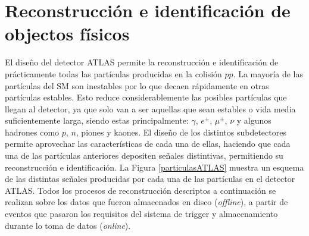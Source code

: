 \chapter{Reconstrucción e identificación de objectos físicos} %



El diseño del detector ATLAS permite la reconstrucción e identificación de prácticamente todas las
partículas producidas en la colisión $pp$. 
La mayoría de las partículas del SM son inestables por lo que decaen rápidamente en otras partículas estables. Esto reduce considerablemente las posibles partículas que llegan
al detector, ya que solo van a ser aquellas que sean estables o vida media suficientemente larga, siendo estas principalmente: $\gamma$, $e^{\pm}$, $\mu^{\pm}$, $\nu$ y algunos hadrones
como $p$, $n$, piones y kaones. El diseño de los distintos subdetectores permite aprovechar las
características de cada una de ellas, haciendo que cada una de las partículas anteriores depositen señales distintivas, permitiendo su reconstrucción e identificación. La Figura \ref{particulasATLAS} muestra un esquema de las distintas señales producidas por cada una de las partículas en el detector ATLAS. Todos los procesos de reconstrucción descriptos a continuación se realizan sobre los datos que fueron almacenados en disco (\textit{offline}), a partir de eventos que pasaron los requisitos del sistema de trigger y almacenamiento durante lo toma de datos (\textit{online}).




